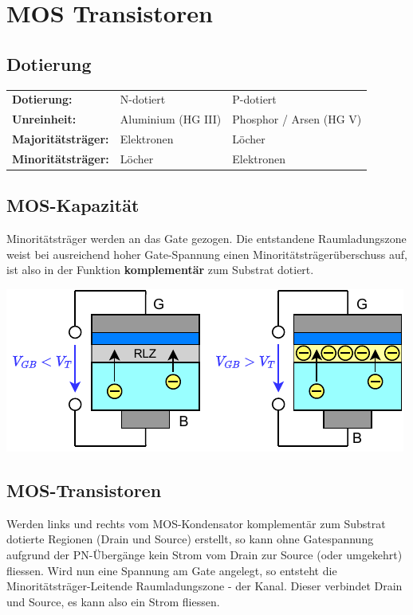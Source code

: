\section{MOS Transistoren}

\subsection{Dotierung}
\begin{center}
    \begin{tabular}{lll}
        \textbf{Dotierung:}          & N-dotiert            & P-dotiert \\
        \textbf{Unreinheit:}         & Aluminium (HG III)   & Phosphor / Arsen (HG V) \\
        \textbf{Majoritätsträger:}   & Elektronen           & Löcher \\
        \textbf{Minoritätsträger:}   & Löcher               & Elektronen \\
    \end{tabular}
\end{center}


\subsection{MOS-Kapazität}
\begin{minipage}[t]{0.5\columnwidth}
    Minoritätsträger werden an das Gate gezogen.
    Die entstandene Raumladungszone weist bei ausreichend hoher Gate-Spannung einen Minoritätsträgerüberschuss auf, ist also in der Funktion \textbf{komplementär} zum Substrat dotiert.
\end{minipage}
\hfill
\begin{minipage}[t]{0.48\columnwidth}
    \includegraphics[width=\columnwidth, align=t]{images/MOS_kapazitaet.pdf}
\end{minipage}


\subsection{MOS-Transistoren}
Werden links und rechts vom MOS-Kondensator komplementär zum Substrat dotierte Regionen (Drain und Source) erstellt, so kann ohne Gatespannung aufgrund der PN-Übergänge kein Strom vom Drain zur Source (oder umgekehrt) fliessen.
Wird nun eine Spannung am Gate angelegt, so entsteht die Minoritätsträger-Leitende Raumladungszone - der Kanal.
Dieser verbindet Drain und Source, es kann also ein Strom fliessen.

